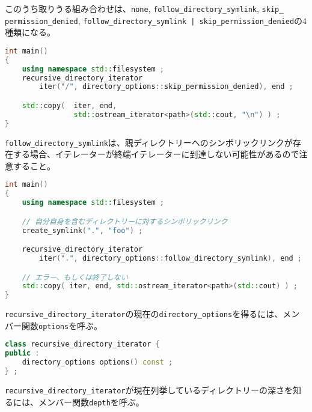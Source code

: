 このうち取りうる組み合わせは、\lstinline!none!,
\lstinline!follow_directory_symlink!,
\lstinline[breaklines=true]!skip_ permission_denied!,
\lstinline!follow_directory_symlink | skip_permission_denied!の4種類になる。

\begin{lstlisting}[language=C++]
int main()
{
    using namespace std::filesystem ; 
    recursive_directory_iterator
        iter("/", directory_options::skip_permission_denied), end ;

    std::copy(  iter, end,
                std::ostream_iterator<path>(std::cout, "\n") ) ;
}
\end{lstlisting}

\lstinline!follow_directory_symlink!は、親ディレクトリーへのシンボリックリンクが存在する場合、イテレーターが終端イテレーターに到達しない可能性があるので注意すること。

\begin{lstlisting}[language=C++]
int main()
{
    using namespace std::filesystem ;

    // 自分自身を含むディレクトリーに対するシンボリックリンク
    create_symlink(".", "foo") ;

    recursive_directory_iterator
        iter(".", directory_options::follow_directory_symlink), end ;

    // エラー、もしくは終了しない
    std::copy( iter, end, std::ostream_iterator<path>(std::cout) ) ;
}
\end{lstlisting}

\lstinline!recursive_directory_iterator!の現在の\lstinline!directory_options!を得るには、メンバー関数\lstinline!options!を呼ぶ。

\begin{lstlisting}[language=C++]
class recursive_directory_iterator {
public :
    directory_options options() const ;
} ;
\end{lstlisting}

%

\lstinline!recursive_directory_iterator!が現在列挙しているディレクトリーの深さを知るには、メンバー関数\lstinline!depth!を呼ぶ。

